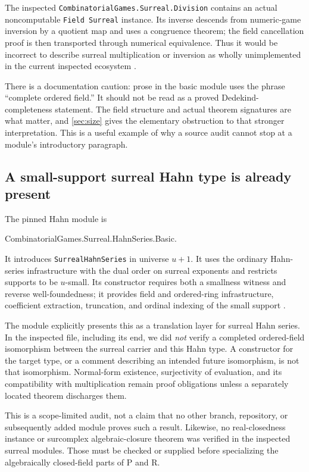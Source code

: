 \documentclass[11pt,letterpaper]{article}
\numberwithin{equation}{section}
\theoremstyle{definition}
\theoremstyle{remark}
\begin{document}
The inspected \texttt{CombinatorialGames.Surreal.Division} contains an actual noncomputable \texttt{Field Surreal} instance. Its inverse descends from numeric-game inversion by a quotient map and uses a congruence theorem; the field cancellation proof is then transported through numerical equivalence. Thus it would be incorrect to describe surreal multiplication or inversion as wholly unimplemented in the current inspected ecosystem \cite{GamesDivision}.

There is a documentation caution: prose in the basic module uses the phrase ``complete ordered field.'' It should not be read as a proved Dedekind-completeness statement. The field structure and actual theorem signatures are what matter, and \cref{sec:size} gives the elementary obstruction to that stronger interpretation. This is a useful example of why a source audit cannot stop at a module's introductory paragraph.

\subsection{A small-support surreal Hahn type is already present}
The pinned Hahn module is
\begin{center}\small\ttfamily
CombinatorialGames.Surreal.HahnSeries.Basic.
\end{center}
It introduces \texttt{SurrealHahnSeries} in universe $u+1$. It uses the ordinary Hahn-series infrastructure with the dual order on surreal exponents and restricts supports to be $u$-small. Its constructor requires both a smallness witness and reverse well-foundedness; it provides field and ordered-ring infrastructure, coefficient extraction, truncation, and ordinal indexing of the small support \cite{GamesHahn}.

The module explicitly presents this as a translation layer for surreal Hahn series. In the inspected file, including its end, we did \emph{not} verify a completed ordered-field isomorphism between the surreal carrier and this Hahn type. A constructor for the target type, or a comment describing an intended future isomorphism, is not that isomorphism. Normal-form existence, surjectivity of evaluation, and its compatibility with multiplication remain proof obligations unless a separately located theorem discharges them.

This is a scope-limited audit, not a claim that no other branch, repository, or subsequently added module proves such a result. Likewise, no real-closedness instance or surcomplex algebraic-closure theorem was verified in the inspected surreal modules. Those must be checked or supplied before specializing the algebraically closed-field parts of P and R.
\end{document}
